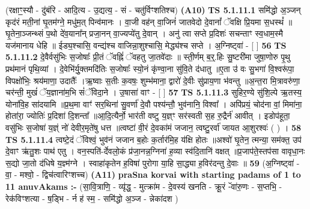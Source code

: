 \documentclass[17pt]{extarticle}
\begin{document}
                  \newline
                      (रक्षाꣳ॒॒स्यौ - दु॑बंरि - आदि॒त्य - उ॒द्यत्य॒ - सं - चतु॑र्विꣳशतिश्च)  \textbf{(A10)} \newline \newline
                                        \textbf{ TS 5.1.11.1} \newline
                  समि॑द्धो अ॒ञ्जन् कृद॑रं मती॒नां घृ॒तम॑ग्ने॒ मधु॑म॒त् पिन्व॑मानः । वा॒जी वह॑न् वा॒जिनं॑ जातवेदो दे॒वानां᳚ ॅवक्षि प्रि॒यमा स॒धस्थं᳚ ॥घृ॒तेना॒ञ्जन्थ्सं प॒थो दे॑व॒याना᳚न् प्रजा॒नन् वा॒ज्यप्ये॑तु दे॒वान् । अनु॑ त्वा सप्ते प्र॒दिशः॑ सचन्ताꣳ स्व॒धाम॒स्मै यज॑मानाय धेहि ॥ ईड्य॒श्चासि॒ वन्द्य॑श्च वाजिन्ना॒शुश्चासि॒ मेद्ध्य॑श्च सप्ते । अ॒ग्निष्ट्वा॑ - [  ] \textbf{  56} \newline
                  \newline
                                \textbf{ TS 5.1.11.2} \newline
                  दे॒वैर्वसु॑भिः स॒जोषाः᳚ प्री॒तं ॅवह्निं॑ ॅवहतु जा॒तवे॑दाः ॥ स्ती॒र्णम् ब॒र्॒.हिः सु॒ष्टरी॑मा जुषा॒णोरु पृ॒थु प्रथ॑मानं पृथि॒व्यां । दे॒वेभि॑र्यु॒क्तमदि॑तिः स॒जोषाः᳚ स्यो॒नं कृ॑ण्वा॒ना सु॑वि॒ते द॑धातु ॥ए॒ता उ॑ वः सु॒भगा॑ वि॒श्वरू॑पा॒ विपक्षो॑भिः॒ श्रय॑माणा॒ उदातैः᳚ ।ऋ॒ष्वाः स॒तीः क॒वषः॒ शुम्भ॑माना॒ द्वारो॑ दे॒वीः सु॑प्राय॒णा भ॑वन्तु ॥अ॒न्त॒रा मि॒त्रावरु॑णा॒ चर॑न्ती॒ मुखं॑ ॅय॒ज्ञाना॑म॒भि सं॑ॅविदा॒ने । उ॒षासा॑ वाꣳ - [  ] \textbf{  57} \newline
                  \newline
                                \textbf{ TS 5.1.11.3} \newline
                  सुहिर॒ण्ये सु॑शि॒ल्पे ऋ॒तस्य॒ योना॑वि॒ह सा॑दयामि ॥प्र॒थ॒मा वाꣳ॑ सर॒थिना॑ सु॒वर्णा॑ दे॒वौ पश्य॑न्तौ॒ भुव॑नानि॒ विश्वा᳚ । अपि॑प्रयं॒ चोद॑ना वां॒ मिमा॑ना॒ होता॑रा॒ ज्योतिः॑ प्र॒दिशा॑ दि॒शन्ता᳚ ॥आ॒दि॒त्यैर्नो॒ भार॑ती वष्टु य॒ज्ञ्ꣳ सर॑स्वती स॒ह रु॒द्रैर्न॑ आवीत् । इडोप॑हूता॒ वसु॑भिः स॒जोषा॑ य॒ज्ञ्ं नो॑ देवीर॒मृते॑षु धत्त ॥त्वष्टा॑ वी॒रं दे॒वका॑मं जजान॒ त्वष्टु॒रर्वा॑ जायत आ॒शुरश्वः॑ ( ) । \textbf{  58} \newline
                  \newline
                                \textbf{ TS 5.1.11.4} \newline
                  त्वष्टे॒दं ॅविश्वं॒ भुव॑नं जजान ब॒होः क॒र्तार॑मि॒ह य॑क्षि होतः ॥अश्वो॑ घृ॒तेन॒ त्मन्या॒ सम॑क्त॒ उप॑ दे॒वाꣳ ऋ॑तु॒शः पाथ॑ एतु । वन॒स्पति॑-र्देवलो॒कं प्र॑जा॒नन्न॒ग्निना॑ ह॒व्या स्व॑दि॒तानि॑ वक्षत् ॥प्र॒जाप॑ते॒स्तप॑सा वावृधा॒नः स॒द्यो जा॒तो द॑धिषे य॒ज्ञ्म॑ग्ने । स्वाहा॑कृतेन ह॒विषा॑ पुरोगा या॒हि सा॒द्ध्या ह॒विर॑दन्तु दे॒वाः ॥ \textbf{  59} \newline
                  \newline
                      (अ॒ग्निष्ट्वा॑ - वा॒ - मश्वो॒ - द्विच॑त्वारिꣳशच्च)  \textbf{(A11)} \newline \newline
                \textbf{praSna korvai with starting padams of 1 to 11 anuvAkams :-} \newline
        (सा॒वि॒त्राणि॒ - व्यृ॑द्ध॒ - मुत्क्रा॑म - दे॒वस्य॑ खनति - क्रू॒रं -ॅवा॑रु॒णः - स॒प्तभि॒ - रेक॑विꣳशत्या - ष॒ड्भि - र्न ह॑ स्म॒ - समि॑द्धो अ॒ञ्ज - न्नेका॑दश ) \newline
\end{document}
